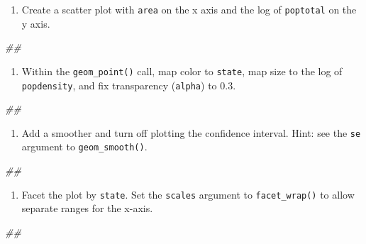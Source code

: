 \documentclass[
]{book}
\newenvironment{Shaded}{\begin{snugshade}}{\end{snugshade}}
\newcommand{\CommentTok}[1]{\textcolor[rgb]{0.56,0.35,0.01}{\textit{#1}}}
\providecommand{\tightlist}{%
  \setlength{\itemsep}{0pt}\setlength{\parskip}{0pt}}
\begin{document}
\begin{enumerate}
\def\labelenumi{\arabic{enumi}.}
\tightlist
\item
  Create a scatter plot with \texttt{area} on the x axis and the log of \texttt{poptotal} on the y axis.
\end{enumerate}

\begin{Shaded}
\begin{Highlighting}[]
\CommentTok{\#\# }
\end{Highlighting}
\end{Shaded}

\begin{enumerate}
\def\labelenumi{\arabic{enumi}.}
\setcounter{enumi}{1}
\tightlist
\item
  Within the \texttt{geom\_point()} call, map color to \texttt{state}, map size to the log of \texttt{popdensity}, and fix transparency (\texttt{alpha}) to 0.3.
\end{enumerate}

\begin{Shaded}
\begin{Highlighting}[]
\CommentTok{\#\# }
\end{Highlighting}
\end{Shaded}

\begin{enumerate}
\def\labelenumi{\arabic{enumi}.}
\setcounter{enumi}{2}
\tightlist
\item
  Add a smoother and turn off plotting the confidence interval. Hint: see the \texttt{se} argument to \texttt{geom\_smooth()}.
\end{enumerate}

\begin{Shaded}
\begin{Highlighting}[]
\CommentTok{\#\# }
\end{Highlighting}
\end{Shaded}

\begin{enumerate}
\def\labelenumi{\arabic{enumi}.}
\setcounter{enumi}{3}
\tightlist
\item
  Facet the plot by \texttt{state}. Set the \texttt{scales} argument to \texttt{facet\_wrap()} to allow separate ranges for the x-axis.
\end{enumerate}

\begin{Shaded}
\begin{Highlighting}[]
\CommentTok{\#\# }
\end{Highlighting}
\end{Shaded}
\end{document}
